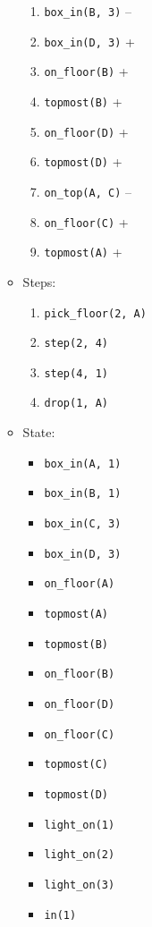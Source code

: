 \documentclass[12pt]{article}
\begin{document}
\begin{enumerate}
\begin{itemize}
\begin{enumerate}
          \item \texttt{box\_in(B, 3)} --
          \item \texttt{box\_in(D, 3)} +
          \item \texttt{on\_floor(B)} +
          \item \texttt{topmost(B)} +
          \item \texttt{on\_floor(D)} +
          \item \texttt{topmost(D)} +
          \item \texttt{on\_top(A, C)} --
          \item \texttt{on\_floor(C)} +
          \item \texttt{topmost(A)} +
        \end{enumerate}
      \item Steps:
        \begin{enumerate}
          \item \texttt{pick\_floor(2, A)}
          \item \texttt{step(2, 4)}
          \item \texttt{step(4, 1)}
          \item \texttt{drop(1, A)}
        \end{enumerate}
      \item State:
        \begin{itemize}
          \item \texttt{box\_in(A, 1)}
          \item \texttt{box\_in(B, 1)}
          \item \texttt{box\_in(C, 3)}
          \item \texttt{box\_in(D, 3)}
          \item \texttt{on\_floor(A)}
          \item \texttt{topmost(A)}
          \item \texttt{topmost(B)}
          \item \texttt{on\_floor(B)}
          \item \texttt{on\_floor(D)}
          \item \texttt{on\_floor(C)}
          \item \texttt{topmost(C)}
          \item \texttt{topmost(D)}
          \item \texttt{light\_on(1)}
          \item \texttt{light\_on(2)}
          \item \texttt{light\_on(3)}
          \item \texttt{in(1)}

\end{itemize}
\end{itemize}
\end{enumerate}
\end{document}
